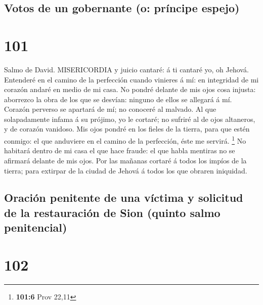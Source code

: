 \hypertarget{votos-de-un-gobernante-o-pruxedncipe-espejo}{%
\subsection{Votos de un gobernante (o: príncipe
espejo)}\label{votos-de-un-gobernante-o-pruxedncipe-espejo}}

\hypertarget{section-100}{%
\section{101}\label{section-100}}

 Salmo de David. MISERICORDIA y juicio cantaré: á ti cantaré
yo, oh Jehová.  Entenderé en el camino de la perfección
cuando vinieres á mí: en integridad de mi corazón andaré en medio de mi
casa.  No pondré delante de mis ojos cosa injusta: aborrezco
la obra de los que se desvían: ninguno de ellos se allegará á mí.
 Corazón perverso se apartará de mí; no conoceré al malvado.
 Al que solapadamente infama á su prójimo, yo le cortaré; no
sufriré al de ojos altaneros, y de corazón vanidoso.  Mis
ojos pondré en los fieles de la tierra, para que estén conmigo: el que
anduviere en el camino de la perfección, éste me servirá. \footnote{\textbf{101:6}
  Prov 22,11}  No habitará dentro de mi casa el que hace
fraude: el que habla mentiras no se afirmará delante de mis ojos.
 Por las mañanas cortaré á todos los impíos de la tierra;
para extirpar de la ciudad de Jehová á todos los que obraren iniquidad.

\hypertarget{oraciuxf3n-penitente-de-una-vuxedctima-y-solicitud-de-la-restauraciuxf3n-de-sion-quinto-salmo-penitencial}{%
\subsection{Oración penitente de una víctima y solicitud de la
restauración de Sion (quinto salmo
penitencial)}\label{oraciuxf3n-penitente-de-una-vuxedctima-y-solicitud-de-la-restauraciuxf3n-de-sion-quinto-salmo-penitencial}}

\hypertarget{section-101}{%
\section{102}\label{section-101}}

